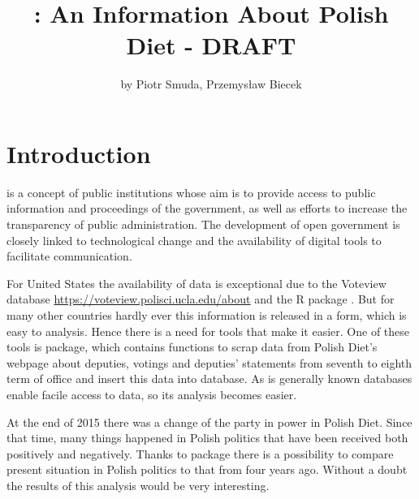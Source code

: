 \title{: An Information About Polish Diet - DRAFT}
\author{by Piotr Smuda, Przemysław Biecek}

\maketitle


\section{Introduction}

 is a concept of public institutions whose aim is to provide access to public information and proceedings of the government, as well as efforts to increase the transparency of public administration. The development of open government is closely linked to technological change and the availability of digital tools to facilitate communication.

For United States the availability of data is exceptional due to the Voteview database \url{https://voteview.polisci.ucla.edu/about} and the R package . But for many other countries hardly ever this information is released in a form, which is easy to analysis. Hence there is a need for tools that make it easier. One of these tools is  package, which contains functions to scrap data from Polish Diet's webpage about deputies, votings and deputies' statements from seventh to eighth term of office and insert this data into database. As is generally known databases enable facile access to data, so its analysis becomes easier.

At the end of 2015 there was a change of the party in power in Polish Diet. Since that time, many things happened in Polish politics that have been received both positively and negatively. Thanks to  package there is a possibility to compare present situation in Polish politics to that from four years ago. Without a doubt the results of this analysis would be very interesting.

